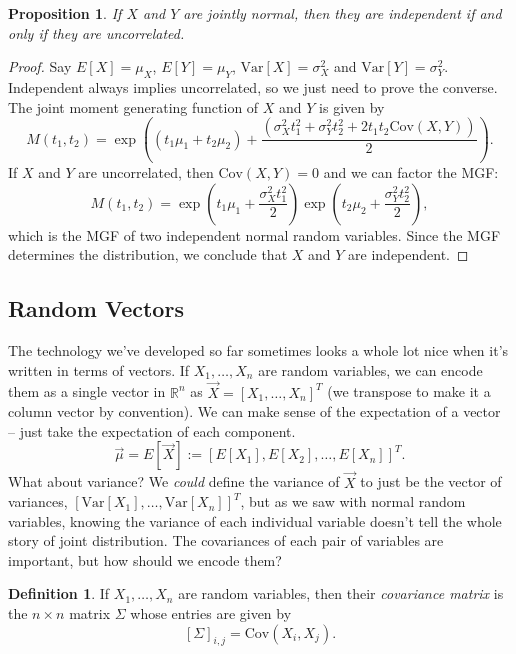 \documentclass[12pt]{article}
\theoremstyle{plain}
\newtheorem{proposition}[theorem]{Proposition}
\theoremstyle{definition}
\newtheorem{definition}[theorem]{Definition}
\theoremstyle{remark}
\newcommand{\Var}{\ensuremath{\textrm{Var}}}
\newcommand{\Cov}{\ensuremath{\textrm{Cov}}}
\newcommand{\R}{\mathbb{R}}
\begin{document}
\begin{proposition}
If $X$ and $Y$ are jointly normal, then they are independent if and only if they are uncorrelated.
\end{proposition}
\begin{proof}
    Say $E[X] = \mu_X$, $E[Y] = \mu_Y$, $\Var[X] = \sigma_X^2$ and $\Var[Y] = \sigma_Y^2$.
    Independent always implies uncorrelated, so we just need to prove the converse.
    The joint moment generating function of $X$ and $Y$ is given by
    \[
        M(t_1, t_2) = \exp\left((t_1\mu_1 + t_2\mu_2) + \frac{(\sigma_X^2t_1^2 + \sigma_Y^2t_2^2 + 2t_1t_2\Cov(X,Y))}{2}\right).
    \]
    If $X$ and $Y$ are uncorrelated, then $\Cov(X,Y) = 0$ and we can factor the MGF:
    \[
        M(t_1, t_2) = \exp\left(t_1\mu_1 + \frac{\sigma_X^2t_1^2}{2}\right)\exp\left(t_2\mu_2 + \frac{\sigma_Y^2t_2^2}{2}\right),
    \]
    which is the MGF of two independent normal random variables.
    Since the MGF determines the distribution, we conclude that $X$ and $Y$ are independent.
\end{proof}










\subsection{Random Vectors}
The technology we've developed so far sometimes looks a whole lot nice when it's written in terms of vectors.
If $X_1, \ldots, X_n$ are random variables, we can encode them as a single vector in $\R^n$ as $\vec{X} = [X_1, \ldots, X_n]^T$ (we transpose to make it a column vector by convention).
We can make sense of the expectation of a vector -- just take the expectation of each component.
\[
    \vec{\mu}= E[\vec{X}] := [E[X_1], E[X_2], \ldots, E[X_n]]^T.
\]
What about variance?
We \emph{could} define the variance of $\vec{X}$ to just be the vector of variances, $[\Var[X_1], \ldots, \Var[X_n]]^T$, but as we saw with normal random variables, knowing the variance of each individual variable doesn't tell the whole story of joint distribution.
The covariances of each pair of variables are important, but how should we encode them?
\begin{definition}
    If $X_1, \ldots, X_n$ are random variables, then their \emph{covariance matrix} is the $n\times n$ matrix $\Sigma$ whose entries are given by
    \[
        [\Sigma]_{i,j} = \Cov(X_i, X_j).
    \]
\end{definition}
\end{document}
